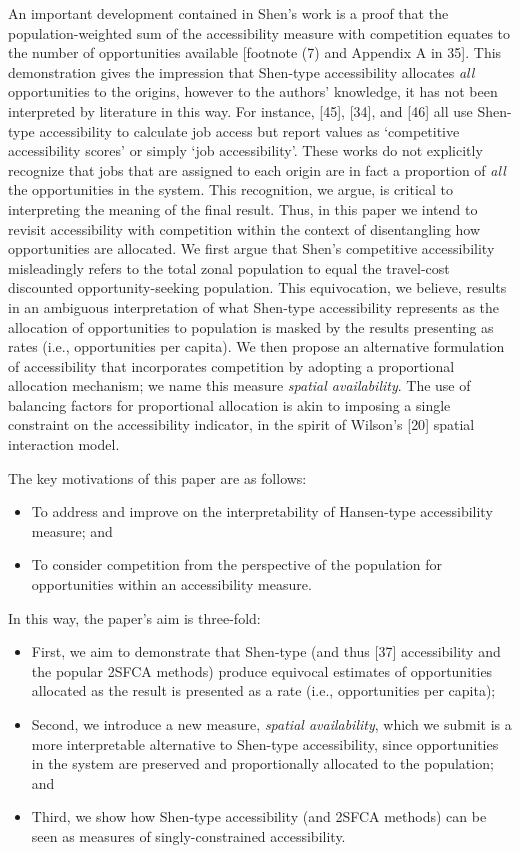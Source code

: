 \documentclass[10pt,letterpaper]{article}
\begin{document}
An important development contained in Shen's work is a proof that the
population-weighted sum of the accessibility measure with competition
equates to the number of opportunities available {[}footnote (7) and
Appendix A in 35{]}. This demonstration gives the impression that
Shen-type accessibility allocates \emph{all} opportunities to the
origins, however to the authors' knowledge, it has not been interpreted
by literature in this way. For instance, {[}45{]}, {[}34{]}, and
{[}46{]} all use Shen-type accessibility to calculate job access but
report values as `competitive accessibility scores' or simply `job
accessibility'. These works do not explicitly recognize that jobs that
are assigned to each origin are in fact a proportion of \emph{all} the
opportunities in the system. This recognition, we argue, is critical to
interpreting the meaning of the final result. Thus, in this paper we
intend to revisit accessibility with competition within the context of
disentangling how opportunities are allocated. We first argue that
Shen's competitive accessibility misleadingly refers to the total zonal
population to equal the travel-cost discounted opportunity-seeking
population. This equivocation, we believe, results in an ambiguous
interpretation of what Shen-type accessibility represents as the
allocation of opportunities to population is masked by the results
presenting as rates (i.e., opportunities per capita). We then propose an
alternative formulation of accessibility that incorporates competition
by adopting a proportional allocation mechanism; we name this measure
\emph{spatial availability}. The use of balancing factors for
proportional allocation is akin to imposing a single constraint on the
accessibility indicator, in the spirit of Wilson's {[}20{]} spatial
interaction model.

The key motivations of this paper are as follows:

\begin{itemize}
\item
  To address and improve on the interpretability of Hansen-type
  accessibility measure; and
\item
  To consider competition from the perspective of the population for
  opportunities within an accessibility measure.
\end{itemize}

In this way, the paper's aim is three-fold:

\begin{itemize}
\item
  First, we aim to demonstrate that Shen-type (and thus {[}37{]}
  accessibility and the popular 2SFCA methods) produce equivocal
  estimates of opportunities allocated as the result is presented as a
  rate (i.e., opportunities per capita);
\item
  Second, we introduce a new measure, \emph{spatial availability}, which
  we submit is a more interpretable alternative to Shen-type
  accessibility, since opportunities in the system are preserved and
  proportionally allocated to the population; and
\item
  Third, we show how Shen-type accessibility (and 2SFCA methods) can be
  seen as measures of singly-constrained accessibility.
\end{itemize}
\end{document}
